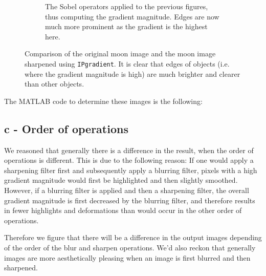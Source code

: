 \begin{figure}[!Hbt]
\begin{subfigure}[b]{0.45\textwidth}
  \caption{The Sobel operators applied to the previous figures, thus computing the gradient magnitude. Edges are now much more prominent as the gradient is the highest here.}
  \label{fig:moonSharp}
 \end{subfigure}
 \caption{Comparison of the original moon image and the moon image sharpened using \texttt{IPgradient}. It is clear that edges of objects (i.e. where the gradient magnitude is high) are much brighter and clearer than other objects.}
 \label{fig:moon}
\end{figure}
The MATLAB code to determine these images is the following:

\subsection*{c - Order of operations}
We reasoned that generally there is a difference in the result, when the order of operations is different.
This is due to the following reason:
If one would apply a sharpening filter first and subsequently apply a blurring filter, pixels with a high gradient magnitude would first be highlighted and then slightly smoothed.
However, if a blurring filter is applied and then a sharpening filter, the overall gradient magnitude is first decreased by the blurring filter, and therefore results in fewer highlights and deformations than would occur in the other order of operations.

Therefore we figure that there will be a difference in the output images depending of the order of the blur and sharpen operations. We'd also reckon that generally images are more aesthetically pleasing when an image is first blurred and then sharpened.

